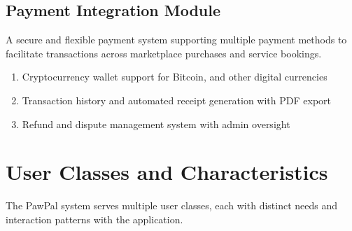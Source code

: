 \subsection{Payment Integration Module}
A secure and flexible payment system supporting multiple payment methods to facilitate transactions across marketplace purchases and service bookings. 
\begin{enumerate}

    \item Cryptocurrency wallet support for Bitcoin, and other digital currencies
    \item Transaction history and automated receipt generation with PDF export
    \item Refund and dispute management system with admin oversight
 
  
\end{enumerate}

\section{User Classes and Characteristics}

The PawPal system serves multiple user classes, each with distinct needs and interaction patterns with the application.

\clearpage

